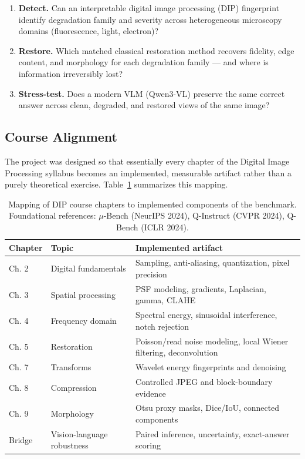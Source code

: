 \documentclass[11pt]{article}
\begin{document}
\begin{enumerate}[leftmargin=1.6em]
    \item \textbf{Detect.} Can an interpretable digital image processing (DIP)
    fingerprint identify degradation family and severity across heterogeneous
    microscopy domains (fluorescence, light, electron)?
    \item \textbf{Restore.} Which matched classical restoration method recovers
    fidelity, edge content, and morphology for each degradation family --- and where
    is information irreversibly lost?
    \item \textbf{Stress-test.} Does a modern VLM (Qwen3-VL) preserve the same correct
    answer across clean, degraded, and restored views of the same image?
\end{enumerate}

\subsection{Course Alignment}

The project was designed so that essentially every chapter of the Digital Image
Processing syllabus becomes an implemented, measurable artifact rather than a purely
theoretical exercise. Table~\ref{tab:syllabus} summarizes this mapping.

\begin{table}[h]
\centering
\small
\begin{tabularx}{\linewidth}{@{}l l X@{}}
\toprule
\textbf{Chapter} & \textbf{Topic} & \textbf{Implemented artifact} \\
\midrule
Ch. 2 & Digital fundamentals & Sampling, anti-aliasing, quantization, pixel precision \\
Ch. 3 & Spatial processing & PSF modeling, gradients, Laplacian, gamma, CLAHE \\
Ch. 4 & Frequency domain & Spectral energy, sinusoidal interference, notch rejection \\
Ch. 5 & Restoration & Poisson/read noise modeling, local Wiener filtering, deconvolution \\
Ch. 7 & Transforms & Wavelet energy fingerprints and denoising \\
Ch. 8 & Compression & Controlled JPEG and block-boundary evidence \\
Ch. 9 & Morphology & Otsu proxy masks, Dice/IoU, connected components \\
Bridge & Vision-language robustness & Paired inference, uncertainty, exact-answer scoring \\
\bottomrule
\end{tabularx}
\caption{Mapping of DIP course chapters to implemented components of the benchmark.
Foundational references: $\mu$-Bench (NeurIPS 2024), Q-Instruct (CVPR 2024), Q-Bench
(ICLR 2024).}
\label{tab:syllabus}
\end{table}
\end{document}
